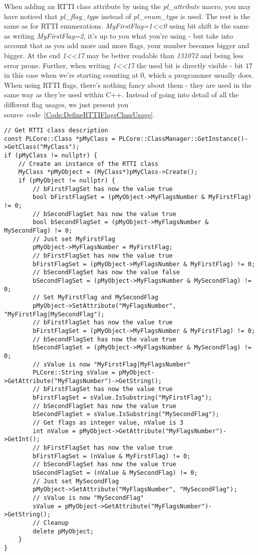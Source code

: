 When adding an RTTI class attribute by using the \emph{pl\_attribute} macro, you may have noticed that \emph{pl\_flag\_type} instead of \emph{pl\_enum\_type} is used. The rest is the same as for RTTI enumerations. \emph{MyFirstFlag=1<<0} using bit shift is the same as writing \emph{MyFirstFlag=2}, it's up to you what you're using - but take into account that as you add more and more flags, your number becomes bigger and bigger. At the end \emph{1<<17} may be better readable than \emph{131072} and being less error prone. Further, when writing \emph{1<<17} the used bit is directly visible - bit $17$ in this case when we're starting counting at $0$, which a programmer usually does. When using RTTI flags, there's nothing fancy about them - they are used in the same way as they're used within C++. Instead of going into detail of all the different flag usages, we just present you source~code~\ref{Code:DefineRTTIFlagsClassUsage}.
\begin{lstlisting}[label=Code:DefineRTTIFlagsClassUsage,caption={Using a RTTI class with an flag attribute}]
// Get RTTI class description
const PLCore::Class *pMyClass = PLCore::ClassManager::GetInstance()->GetClass("MyClass");
if (pMyClass != nullptr) {
	// Create an instance of the RTTI class
	MyClass *pMyObject = (MyClass*)pMyClass->Create();
	if (pMyObject != nullptr) {
		// bFirstFlagSet has now the value true
		bool bFirstFlagSet = (pMyObject->MyFlagsNumber & MyFirstFlag) != 0;
		// bSecondFlagSet has now the value true
		bool bSecondFlagSet = (pMyObject->MyFlagsNumber & MySecondFlag) != 0;
		// Just set MyFirstFlag
		pMyObject->MyFlagsNumber = MyFirstFlag;
		// bFirstFlagSet has now the value true
		bFirstFlagSet = (pMyObject->MyFlagsNumber & MyFirstFlag) != 0;
		// bSecondFlagSet has now the value false
		bSecondFlagSet = (pMyObject->MyFlagsNumber & MySecondFlag) != 0;
		// Set MyFirstFlag and MySecondFlag
		pMyObject->SetAttribute("MyFlagsNumber", "MyFirstFlag|MySecondFlag");
		// bFirstFlagSet has now the value true
		bFirstFlagSet = (pMyObject->MyFlagsNumber & MyFirstFlag) != 0;
		// bSecondFlagSet has now the value true
		bSecondFlagSet = (pMyObject->MyFlagsNumber & MySecondFlag) != 0;
		// sValue is now "MyFirstFlag|MyFlagsNumber"
		PLCore::String sValue = pMyObject->GetAttribute("MyFlagsNumber")->GetString();
		// bFirstFlagSet has now the value true
		bFirstFlagSet = sValue.IsSubstring("MyFirstFlag");
		// bSecondFlagSet has now the value true
		bSecondFlagSet = sValue.IsSubstring("MySecondFlag");
		// Get flags as integer value, nValue is 3
		int nValue = pMyObject->GetAttribute("MyFlagsNumber")->GetInt();
		// bFirstFlagSet has now the value true
		bFirstFlagSet = (nValue & MyFirstFlag) != 0;
		// bSecondFlagSet has now the value true
		bSecondFlagSet = (nValue & MySecondFlag) != 0;
		// Just set MySecondFlag
		pMyObject->SetAttribute("MyFlagsNumber", "MySecondFlag");
		// sValue is now "MySecondFlag"
		sValue = pMyObject->GetAttribute("MyFlagsNumber")->GetString();
		// Cleanup
		delete pMyObject;
	}
}
\end{lstlisting}


